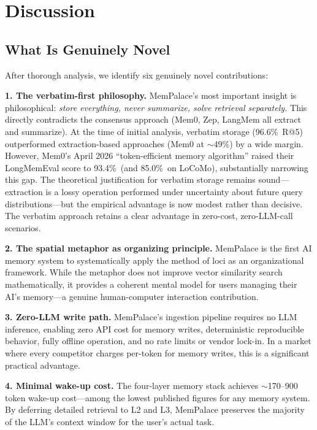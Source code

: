 \documentclass[twoside,11pt]{article}
\begin{document}
\section{Discussion}
\label{sec:discussion}

\subsection{What Is Genuinely Novel}

After thorough analysis, we identify six genuinely novel contributions:

\textbf{1. The verbatim-first philosophy.}  MemPalace's most important insight
is philosophical: \emph{store everything, never summarize, solve retrieval
separately.}  This directly contradicts the consensus approach (Mem0, Zep,
LangMem all extract and summarize).  At the time of initial analysis, verbatim
storage (96.6\%\ R@5) outperformed extraction-based approaches (Mem0 at
$\sim$49\%) by a wide margin.  However, Mem0's April 2026 ``token-efficient
memory algorithm'' raised their LongMemEval score to 93.4\%\ (and 85.0\%\ on
LoCoMo), substantially narrowing this gap.  The theoretical justification for
verbatim storage remains sound---extraction is a lossy operation performed
under uncertainty about future query distributions---but the empirical
advantage is now modest rather than decisive.  The verbatim approach retains a
clear advantage in zero-cost, zero-LLM-call scenarios.

\textbf{2. The spatial metaphor as organizing principle.}  MemPalace is the
first AI memory system to systematically apply the method of loci as an
organizational framework.  While the metaphor does not improve vector
similarity search mathematically, it provides a coherent mental model for
users managing their AI's memory---a genuine human-computer interaction
contribution.

\textbf{3. Zero-LLM write path.}  MemPalace's ingestion pipeline requires no
LLM inference, enabling zero API cost for memory writes, deterministic
reproducible behavior, fully offline operation, and no rate limits or vendor
lock-in.  In a market where every competitor charges per-token for memory
writes, this is a significant practical advantage.

\textbf{4. Minimal wake-up cost.}  The four-layer memory stack achieves
$\sim$170--900 token wake-up cost---among the lowest published figures for any
memory system.  By deferring detailed retrieval to L2 and L3, MemPalace
preserves the majority of the LLM's context window for the user's actual task.
\end{document}
